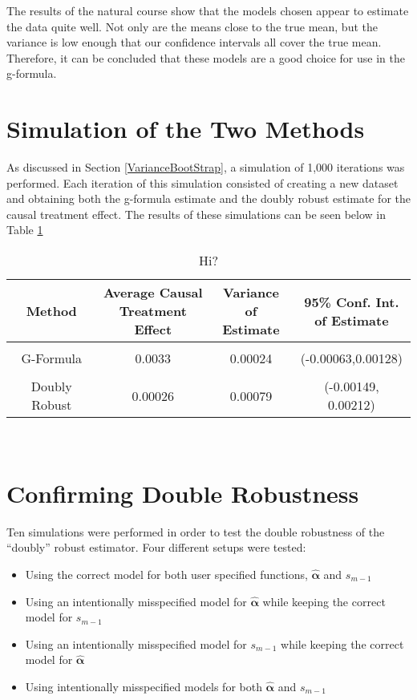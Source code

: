 The results of the natural course show that the models chosen appear to estimate the data quite well.  Not only are the means close to the true mean, but the variance is low enough that our confidence intervals all cover the true mean.  Therefore, it can be concluded that these models are a good choice for use in the g-formula.  

\section{Simulation of the Two Methods} 
As discussed in Section \ref{VarianceBootStrap}, a simulation of 1,000 iterations was performed.  Each iteration of this simulation consisted of creating a new dataset and obtaining both the g-formula estimate and the doubly robust estimate for the causal treatment effect.  The results of these simulations can be seen below in Table \ref{simdata} 

\begin{table}[h!]
\centering
\begin{tabular}{c | c c c }
Method & \shortstack{Average Causal \\ Treatment Effect} & \shortstack{Variance\\ of Estimate} & \shortstack{95\% Conf. Int.\\ of Estimate} \\ 
\hline \\
G-Formula & 0.0033 & 0.00024&(-0.00063,0.00128)\\ \\ 
Doubly Robust & 0.00026 &0.00079 & (-0.00149, 0.00212)
\end{tabular} \\
\centering
\caption{Hi? \label{simdata}}
\end{table}


\section{Confirming Double Robustness} 
Ten simulations were performed in order to test the double robustness of the ``doubly'' robust estimator.  Four different setups were tested: 
\begin{itemize} 
\item Using the correct model for both user specified functions, $\hat{\mathbf{\alpha}}$ and $s_{m-1}$ 
\item Using an intentionally misspecified model for $\hat{\mathbf{\alpha}}$ while keeping the correct model for $s_{m-1}$ 
\item Using an intentionally misspecified model for $s_{m-1}$ while keeping the correct model for $\hat{\mathbf{\alpha}}$
\item Using intentionally misspecified models for both $\hat{\mathbf{\alpha}}$ and $s_{m-1}$ 
\end{itemize} 


